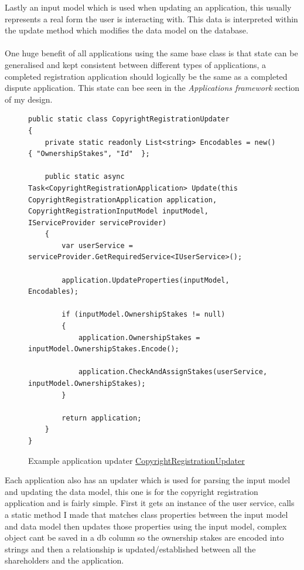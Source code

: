 \documentclass[12pt]{article}
\newcommand{\br}[0]{\\~\\}
\begin{document}
Lastly an input model which is used when updating an application, this usually represents a real form the user is interacting with. This data is interpreted within the update method which modifies the data model on the database.
\br
One huge benefit of all applications using the same base class is that state can be generalised and kept consistent between different types of applications, a completed registration application should logically be the same as a completed dispute application.
This state can bee seen in the \textit{Applications framework} section of my design.

\begin{figure}[H]
\caption{Example application updater \href{https://github.com/MrHarrisonBarker/CRPL/blob/main/CRPL.Web/Core/Applications/Updaters/CopyrightRegistrationUpdater.cs}{CopyrightRegistrationUpdater}}
\centering
\begin{lstlisting}[language=CSharp]
public static class CopyrightRegistrationUpdater
{
    private static readonly List<string> Encodables = new() { "OwnershipStakes", "Id"  };
    
    public static async Task<CopyrightRegistrationApplication> Update(this CopyrightRegistrationApplication application, CopyrightRegistrationInputModel inputModel, IServiceProvider serviceProvider)
    {
        var userService = serviceProvider.GetRequiredService<IUserService>();
        
        application.UpdateProperties(inputModel, Encodables);

        if (inputModel.OwnershipStakes != null)
        {
            application.OwnershipStakes = inputModel.OwnershipStakes.Encode();

            application.CheckAndAssignStakes(userService, inputModel.OwnershipStakes);
        }

        return application;
    }
}
\end{lstlisting} 
\end{figure}

Each application also has an updater which is used for parsing the input model and updating the data model, this one is for the copyright registration application and is fairly simple. First it gets an instance of the user service, calls a static method I made that matches class properties between the input model and data model then updates those properties using the input model, complex object cant be saved in a db column so the ownership stakes are encoded into strings and then a relationship is updated/established between all the shareholders and the application.
\end{document}
